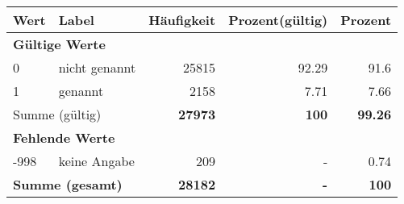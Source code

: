      \begin{longtable}{lXrrr}
     \toprule
     \textbf{Wert} & \textbf{Label} & \textbf{Häufigkeit} & \textbf{Prozent(gültig)} & \textbf{Prozent} \\
     \endhead
     \midrule
     \multicolumn{5}{l}{\textbf{Gültige Werte}}\\

     0 &
     \multicolumn{1}{X}{ nicht genannt   } &


       \num{25815} &
       \num[round-mode=places,round-precision=2]{92.29} &
         \num[round-mode=places,round-precision=2]{91.6} \\

     1 &
     \multicolumn{1}{X}{ genannt   } &


       \num{2158} &
       \num[round-mode=places,round-precision=2]{7.71} &
         \num[round-mode=places,round-precision=2]{7.66} \\
     \midrule
     \multicolumn{2}{l}{Summe (gültig)} &
       \textbf{\num{27973}} &
     \textbf{\num{100}} &
       \textbf{\num[round-mode=places,round-precision=2]{99.26}} \\
     \multicolumn{5}{l}{\textbf{Fehlende Werte}}\\
       -998 &
       keine Angabe &
         \num{209} &
        - &
         \num[round-mode=places,round-precision=2]{0.74} \\
     \midrule
     \multicolumn{2}{l}{\textbf{Summe (gesamt)}} &
          \textbf{\num{28182}} &
        \textbf{-} &
        \textbf{\num{100}} \\
     \bottomrule
     \end{longtable}
     
